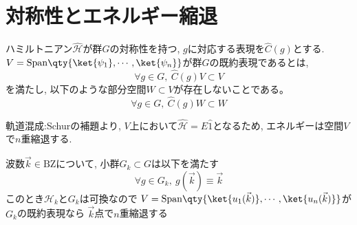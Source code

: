 \section{対称性とエネルギー縮退}

ハミルトニアン$\hat{\mathcal{H}}$が群$G$の対称性を持つ, $g$に対応する表現を$\hat{C}(g)$とする.
$V = \mathrm{Span}\qty{\ket{\psi_1}, \cdots ,\ket{\psi_n}}$が群$G$の既約表現であるとは,
\begin{equation*}
    \forall g \in G,\ \hat{C}(g) V \subset V
\end{equation*}
を満たし, 以下のような部分空間$W \subset V$が存在しないことである。
\begin{equation*}
    \forall g \in G,\ \hat{C}(g) W \subset W
\end{equation*}

軌道混成:Schurの補題より, $V$上において$\hat{\mathcal{H}}=E\hat{1}$となるため, エネルギーは空間$V$で$n$重縮退する.

\begin{theotcolorbox}[title = バンド構造での縮退]
    波数$\vec{k}\in \mathrm{BZ}$について, 小群$G_k \subset G$は以下を満たす
    \begin{equation*}
        \forall g \in G_k,\ g(\vec{k}) \equiv \vec{k}
    \end{equation*}
    このとき$\mathcal{H}_k$と$G_k$は可換なので
    $V = \mathrm{Span}\qty{\ket{u_1(\vec{k})}, \cdots ,\ket{u_n(\vec{k})}}$が$G_k$の既約表現なら
    $\vec{k}$点で$n$重縮退する
\end{theotcolorbox}
